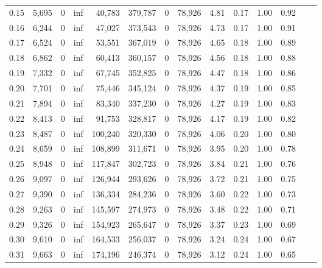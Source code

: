 \begin{tabular}{rrrrrrrrrrrrrr}
0.15 &  5,695 &      0 &      inf &   40,783 &  379,787 &       0 &  78,926 &  4.81 &  0.17 &  1.00 &      0.92 \\
0.16 &  6,244 &      0 &      inf &   47,027 &  373,543 &       0 &  78,926 &  4.73 &  0.17 &  1.00 &      0.91 \\
0.17 &  6,524 &      0 &      inf &   53,551 &  367,019 &       0 &  78,926 &  4.65 &  0.18 &  1.00 &      0.89 \\
0.18 &  6,862 &      0 &      inf &   60,413 &  360,157 &       0 &  78,926 &  4.56 &  0.18 &  1.00 &      0.88 \\
0.19 &  7,332 &      0 &      inf &   67,745 &  352,825 &       0 &  78,926 &  4.47 &  0.18 &  1.00 &      0.86 \\
0.20 &  7,701 &      0 &      inf &   75,446 &  345,124 &       0 &  78,926 &  4.37 &  0.19 &  1.00 &      0.85 \\
0.21 &  7,894 &      0 &      inf &   83,340 &  337,230 &       0 &  78,926 &  4.27 &  0.19 &  1.00 &      0.83 \\
0.22 &  8,413 &      0 &      inf &   91,753 &  328,817 &       0 &  78,926 &  4.17 &  0.19 &  1.00 &      0.82 \\
0.23 &  8,487 &      0 &      inf &  100,240 &  320,330 &       0 &  78,926 &  4.06 &  0.20 &  1.00 &      0.80 \\
0.24 &  8,659 &      0 &      inf &  108,899 &  311,671 &       0 &  78,926 &  3.95 &  0.20 &  1.00 &      0.78 \\
0.25 &  8,948 &      0 &      inf &  117,847 &  302,723 &       0 &  78,926 &  3.84 &  0.21 &  1.00 &      0.76 \\
0.26 &  9,097 &      0 &      inf &  126,944 &  293,626 &       0 &  78,926 &  3.72 &  0.21 &  1.00 &      0.75 \\
0.27 &  9,390 &      0 &      inf &  136,334 &  284,236 &       0 &  78,926 &  3.60 &  0.22 &  1.00 &      0.73 \\
0.28 &  9,263 &      0 &      inf &  145,597 &  274,973 &       0 &  78,926 &  3.48 &  0.22 &  1.00 &      0.71 \\
0.29 &  9,326 &      0 &      inf &  154,923 &  265,647 &       0 &  78,926 &  3.37 &  0.23 &  1.00 &      0.69 \\
0.30 &  9,610 &      0 &      inf &  164,533 &  256,037 &       0 &  78,926 &  3.24 &  0.24 &  1.00 &      0.67 \\
0.31 &  9,663 &      0 &      inf &  174,196 &  246,374 &       0 &  78,926 &  3.12 &  0.24 &  1.00 &      0.65 \\

\end{tabular}

